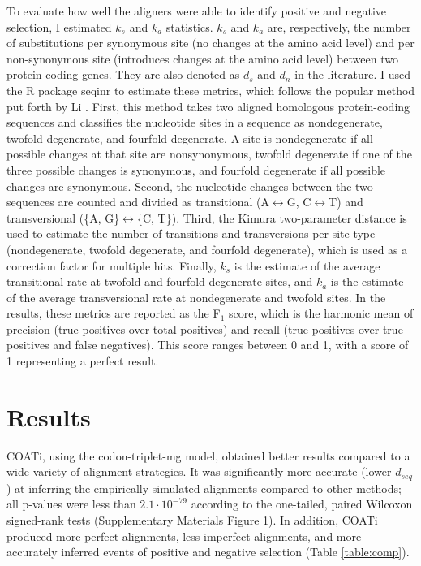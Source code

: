 
To evaluate how well the aligners were able to identify positive and negative selection, I estimated $k_s$ and $k_a$ statistics. $k_s$ and $k_a$ are, respectively, the number of substitutions per synonymous site (no changes at the amino acid level) and per non-synonymous site (introduces changes at the amino acid level) between two protein-coding genes. They are also denoted as $d_s$ and $d_n$ in the literature. I used the R package seqinr \citep{seqinr} to estimate these metrics, which follows the popular method put forth by Li \citep{ka_ks_li_1993}. First, this method takes two aligned homologous protein-coding sequences and classifies the nucleotide sites in a sequence as nondegenerate, twofold degenerate, and fourfold degenerate. A site is nondegenerate if all possible changes at that site are nonsynonymous, twofold degenerate if one of the three possible changes is synonymous, and fourfold degenerate if all possible changes are synonymous. Second, the nucleotide changes between the two sequences are counted and divided as transitional (A$\leftrightarrow$G, C$\leftrightarrow$T) and transversional (\{A, G\}$\leftrightarrow$\{C, T\}). Third, the Kimura two-parameter distance is used to estimate the number of transitions and transversions per site type (nondegenerate, twofold degenerate, and fourfold degenerate), which is used as a correction factor for multiple hits. Finally, $k_s$ is the estimate of the average transitional rate at twofold and fourfold degenerate sites, and $k_a$ is the estimate of the average transversional rate at nondegenerate and twofold sites. In the results, these metrics are reported as the F$_1$ score, which is the harmonic mean of precision (true positives over total positives) and recall (true positives over true positives and false negatives). This score ranges between 0 and 1, with a score of 1 representing a perfect result.


\section{Results}

COATi, using the codon-triplet-mg model, obtained better results compared to a wide variety of alignment strategies.
It was significantly more accurate (lower $d_{seq}$) at inferring the empirically simulated alignments compared to other methods; all p-values were less than $2.1 \cdot 10^{-79}$ according to the one-tailed, paired Wilcoxon signed-rank tests (Supplementary Materials Figure 1).
%
In addition, COATi produced more perfect alignments, less imperfect alignments, and more accurately inferred events of positive and negative selection (Table \ref{table:comp}).

